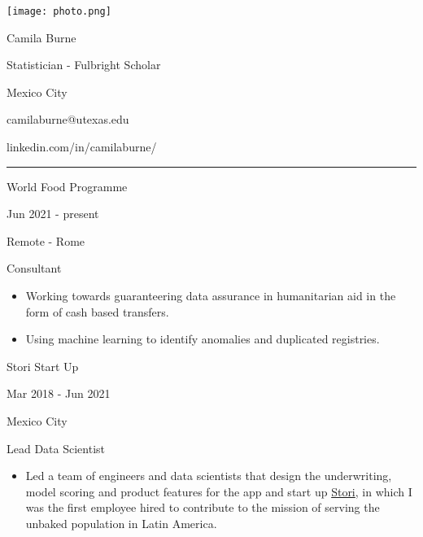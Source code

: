 \documentclass[a4paper,10pt]{article}
\newlength{\cvcolumngapwidth}
\newlength{\cvleftcolumnwidth}
\newlength{\cvrightcolumnwidth}
\newcommand{\cvnamestyle}[1]{{\Large\cvnamefont\textcolor{cvnamecolor}{#1}}}
\newcommand{\cvsectionstyle}[1]{{\normalsize\cvsectionfont\textcolor{cvsectioncolor}{#1}}}
\newcommand{\cvtitlestyle}[1]{{\large\cvtitlefont\textcolor{cvtitlecolor}{#1}}}
\newcommand{\cvdurationstyle}[1]{{\small\cvdurationfont\textcolor{cvdurationcolor}{#1}}}
\newcommand{\cvheadingstyle}[1]{{\normalsize\cvheadingfont\textcolor{cvheadingcolor}{#1}}}
\newlength{\cvafteritemskipamount}
\newlength{\cvaftersectionskipamount}
\newlength{\cvafternameskipamount}
\newlength{\cvafterpersonalinfolineskipamount}
\newlength{\cvaftertitleskipamount}
\newlength{\cvparskip}
\newcommand{\cvpersonalinfo}[2]{
    \begin{minipage}[t]{\cvleftcolumnwidth}
        \vspace{0mm} %
        \raggedleft #1
    \end{minipage}%
    \hspace{\cvcolumngapwidth}%
    \begin{minipage}[t]{\cvrightcolumnwidth}
        \vspace{0mm} %
        #2
    \end{minipage}

    \vspace{\cvafteritemskipamount}
}
\newcommand{\cvname}[1]{
    \cvnamestyle{#1}

    \vspace{\cvafternameskipamount}
}
\newcommand{\cvpersonalinfolinewithicon}[3]{
    \raisebox{.5\fontcharht\font`E-.5\height}{\texttt{[image: \#2]}}
    #3

    \vspace{\cvafterpersonalinfolineskipamount}
}
\newcommand{\cvsection}[1]{
    \begin{minipage}[t]{\cvleftcolumnwidth}
        \raggedleft\cvsectionstyle{#1}
    \end{minipage}%
    \hspace{\cvcolumngapwidth}%
    \begin{minipage}[t]{\cvrightcolumnwidth}
        \textcolor{cvrulecolor}{\rule{\cvrightcolumnwidth}{0.3mm}}
    \end{minipage}

    \vspace{\cvaftersectionskipamount}
}
\newcommand{\cvitem}[2]{
    \begin{minipage}[t]{\cvleftcolumnwidth}
        \raggedleft #1
    \end{minipage}%
    \hspace{\cvcolumngapwidth}%
    \begin{minipage}[t]{\cvrightcolumnwidth}
        \setlength{\parskip}{\cvparskip} #2
    \end{minipage}

    \vspace{\cvafteritemskipamount}
}
\newcommand{\cvtitle}[1]{
    \cvtitlestyle{#1}

    \vspace{\cvaftertitleskipamount}
    \vspace{-\cvparskip}
}
\begin{document}

\cvpersonalinfo{
    \texttt{[image: photo.png]}
}{
    \cvname{Camila Burne}
    \cvtitle{Statistician - Fulbright Scholar}
    \cvdurationstyle{}

    \cvpersonalinfolinewithicon{height=4mm}{072-location.pdf}{
        Mexico City
    }


    \cvpersonalinfolinewithicon{height=4mm}{070-envelop.pdf}{
        camilaburne@utexas.edu
    }

    \cvpersonalinfolinewithicon{height=4mm}{458-linkedin.pdf}{
        linkedin.com/in/camilaburne/
    }

}




\cvsection{WORK EXPERIENCE}

\cvitem{
    \cvheadingstyle{World Food Programme}

    \cvdurationstyle{Jun 2021 - present}

    \cvdurationstyle{Remote - Rome}


}{
    \cvtitle{Consultant}

    \begin{itemize}[leftmargin=*]
    \item Working towards guaranteering data assurance in humanitarian aid in the form of cash based transfers.
    \item Using machine learning to identify anomalies and duplicated registries.
    \end{itemize}
}


\cvitem{
    \cvheadingstyle{Stori Start Up}

    \cvdurationstyle{Mar 2018 - Jun 2021}

    \cvdurationstyle{Mexico City}


}{
    \cvtitle{Lead Data Scientist}


    \begin{itemize}[leftmargin=*]
        \item Led a team of engineers and data scientists that design the underwriting, model scoring and product features for the app and start up \href{https://www.storicard.com/nosotros}{Stori}, in which I was the first employee hired to contribute to the mission of serving the unbaked population in Latin America.
    \end{itemize}
}
\end{document}
